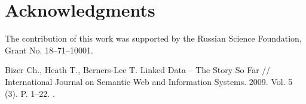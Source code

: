 \documentclass[conference,a4paper]{IEEEtran}
\providecommand\url[1]{\texttt{#1}}
\begin{document}
\section{Acknowledgments}
The contribution of this work was supported by the Russian Science Foundation, Grant No. 18--71--10001.


\begin{thebibliography}{99}
 Bizer Ch., Heath T., Berners-Lee T. Linked Data -- The Story So
  Far // International Journal on Semantic Web and Information Systems.
  2009. Vol. 5 (3). P. 1--22. .


\end{thebibliography}
\end{document}

